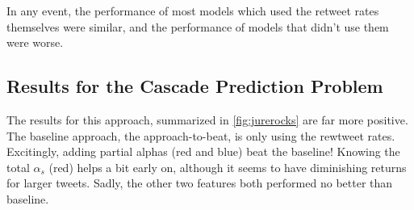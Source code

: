 In any event, the performance of most models which used the retweet rates themselves were similar, and the performance of models that didn't use them were worse.  

\subsection{Results for the Cascade Prediction Problem}

The results for this approach, summarized in \ref{fig:jurerocks} are far more positive.  
The baseline approach, the approach-to-beat, is only using the rewtweet rates.  
Excitingly, adding partial alphas (red and blue) beat the baseline!   Knowing the total $\alpha_s$ (red) helps a bit early on, although it seems to have diminishing returns for larger tweets.  
Sadly, the other two features both performed no better than baseline.


